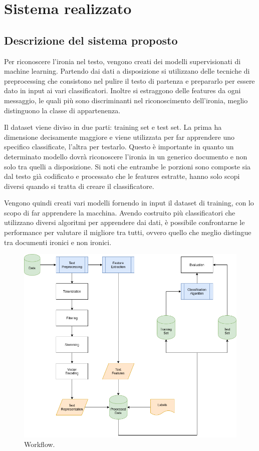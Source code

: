 \documentclass[oneside]{book}
\begin{document}
\chapter{Sistema realizzato}

\section{Descrizione del sistema proposto}
Per riconoscere l'ironia nel testo, vengono creati dei modelli supervisionati di machine learning.
Partendo dai dati a disposizione si utilizzano delle tecniche di preprocessing che consistono nel pulire il testo di partenza e prepararlo per essere dato in input ai vari classificatori. Inoltre si estraggono delle features da ogni messaggio, le quali più sono discriminanti nel riconoscimento dell'ironia, meglio distinguono la classe di appartenenza.

Il dataset viene diviso in due parti: training set e test set. La prima ha dimensione decisamente maggiore e viene utilizzata per far apprendere uno specifico classificate, l'altra per testarlo. Questo è importante in quanto un determinato modello dovrà riconoscere l'ironia in un generico documento e non solo tra quelli a disposizione. Si noti che entrambe le porzioni sono composte sia dal testo già codificato e processato che le features estratte, hanno solo scopi diversi quando si tratta di creare il classificatore. 

Vengono quindi creati vari modelli fornendo in input il dataset di training, con lo scopo di far apprendere la macchina. Avendo costruito più classificatori che utilizzano diversi algoritmi per apprendere dai dati, è possibile confrontarne le performance per valutare il migliore tra tutti, ovvero quello che meglio distingue tra documenti ironici e non ironici.

\begin{figure}
	\includegraphics[width=\linewidth]{assets/Workflow.png}
	\caption{Workflow.}
	\label{fig:workflow}
\end{figure}
\end{document}
